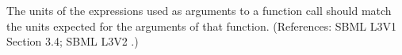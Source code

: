 The units of the expressions used as arguments to a function call
should match the units expected for the arguments of that function.
(References: SBML L3V1 Section 3.4; SBML L3V2 .)
